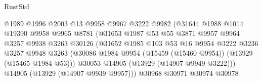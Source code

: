 \begin{lexlean}{RustStd}
\begin{coremodule}
                                        @1989
                                        @1996
                                        @2003
                                        @13
                                        @9958
                                        @9967
                                        @3222
                                        @9982
                                        (@31644
                                          @1988
                                          @1014
                                          @19390
                                          @9958
                                          @9965
                                          @8781
                                          (@31653
                                            @1987
                                            @53
                                            @55
                                            @3871
                                            @9957
                                            @9964
                                            @3257
                                            @9938
                                            @3263
                                            @30126
                                            (@31652
                                              @1985
                                              @103
                                              @53
                                              @16
                                              @9954
                                              @3222
                                              @3236
                                              @3257
                                              @9948
                                              @3263
                                              (@30086
                                                @1984
                                                @9954
                                                (@15459 (@15460 @9954))
                                                (@13929 (@15465 @1984 @53)))
                                              @30053
                                              @14905
                                              (@13929 (@14907 @9949 @3222)))
                                            @14905
                                            (@13929 (@14907 @9939 @9957)))
                                          @30968
                                          @30971
                                          @30974
                                          @30978

\end{coremodule}
\end{lexlean}
